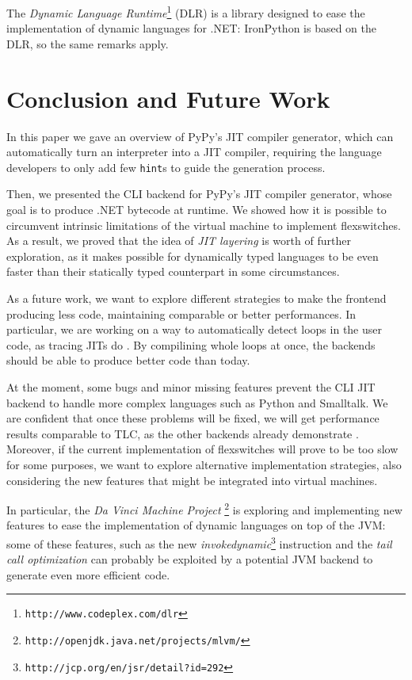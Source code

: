 The \emph{Dynamic Language Runtime}\footnote{\texttt{http://www.codeplex.com/dlr}}
(DLR) is a library designed to ease the implementation of dynamic languages
for .NET: IronPython is based on the DLR, so the same remarks apply.


\section{Conclusion and Future Work}

In this paper we gave an overview of PyPy's JIT compiler generator,
which can automatically turn an interpreter into a JIT
compiler, requiring the language developers to only add few \texttt{hint}s to
guide the generation process.

Then, we presented the CLI backend for PyPy's JIT compiler generator, whose
goal is to produce .NET bytecode at runtime.  We showed how it is possible to
circumvent intrinsic limitations of the virtual machine to implement
flexswitches.  As a result, we proved that the idea of \emph{JIT layering} is
worth of further exploration, as it makes possible for dynamically typed
languages to be even faster than their statically typed counterpart in some
circumstances.

As a future work, we want to explore different strategies to make the frontend
producing less code, maintaining comparable or better performances.  In
particular, we are working on a way to automatically detect loops in the user
code, as tracing JITs do \cite{gal_hotpathvm_2006}.  By compilining whole
loops at once, the backends should be able to produce better code than today.

At the moment, some bugs and minor missing features prevent the CLI JIT
backend to handle more complex languages such as Python and Smalltalk.  We are
confident that once these problems will be fixed, we will get performance
results comparable to TLC, as the other backends already demonstrate
\cite{PyPyJIT}.  Moreover, if the current implementation of flexswitches will
prove to be too slow for some purposes, we want to explore alternative
implementation strategies, also considering the new features that might be
integrated into virtual machines.

In particular, the \emph{Da Vinci Machine
  Project} \footnote{\texttt{http://openjdk.java.net/projects/mlvm/}} is exploring and
implementing new features to ease the implementation of dynamic languages on
top of the JVM: some of these features, such as the new
\emph{invokedynamic}\footnote{\texttt{http://jcp.org/en/jsr/detail?id=292}} instruction and the \emph{tail call
  optimization} can probably be exploited by a potential JVM backend to
generate even more efficient code.
